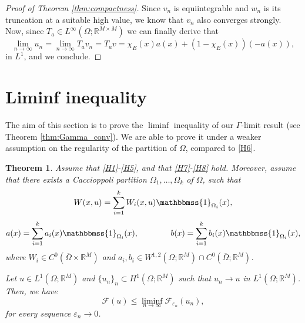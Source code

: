 \documentclass[a4paper, 11pt, reqno]{amsart}
\theoremstyle{plain}
\newtheorem{theorem}{Theorem}[section]
\theoremstyle{definition}
\theoremstyle{remark}
\newcommand{\R}{\mathbb R}
\newcommand{\eps}{\varepsilon}
\newcommand{\ca}{\mathbb{1}}
\def\ca{\mathbbmss{1}}
\begin{document}
\begin{proof}[Proof of Theorem \ref{thm:compactness}]
    Since $v_n$ is equiintegrable and $w_n$ is its truncation at a suitable high value, we know that $v_n$ also converges strongly. Now, since $T_a \in L^\infty(\Omega;\R^{M \times M})$ we can finally derive that
    \[
        \lim_{n \to \infty} u_n = \lim_{n \to \infty} T_a v_n = T_a v =  \chi_E(x)a(x) + (1 - \chi_E(x)) (-a(x)),
    \]
    in $L^1$, and we conclude.
\end{proof}






\section{Liminf inequality}\label{sec:liminf}

The aim of this section is to prove the $\liminf$ inequality of our $\Gamma$-limit result (see Theorem \ref{thm:Gamma_conv}).
We are able to prove it under a weaker assumption on the regularity of the partition of $\Omega$, compared to \ref{H6}.
    
\begin{theorem}\label{thm:liminf}
    Assume that \ref{H1}-\ref{H5}, and that \ref{H7}-\ref{H8} hold.
    Moreover, assume that there exists a Caccioppoli partition $\Omega_1,\dots,\Omega_k$ of $\Omega$, such that
            \[
            W(x,u) = \sum_{i=1}^k W_i(x,u)\ca_{\Omega_i}(x),
            \]
            \[
            a(x) = \sum_{i=1}^k a_i(x)\ca_{\Omega_i}(x),\quad\quad\quad\quad
            b(x) = \sum_{i=1}^k b_i(x)\ca_{\Omega_i}(x),
            \]
            where $W_i\in C^0(\overline{\Omega}\times\R^M)$ and $a_i, b_i\in W^{1,2}(\Omega;\R^M) \cap C^0(\overline{\Omega};\R^M)$.

    Let $u \in L^1(\Omega;\R^M)$ and $\{u_n\}_n \subset H^1(\Omega;\R^M)$ such that $u_n \to u$ in $L^1(\Omega;\R^M)$. Then, we have
    \[
        \mathcal{F}(u) \leq \liminf_{n \to \infty} \mathcal{F}_{\eps_n}(u_n),
    \]
    for every sequence $\eps_n \to 0$.
\end{theorem}
\end{document}
